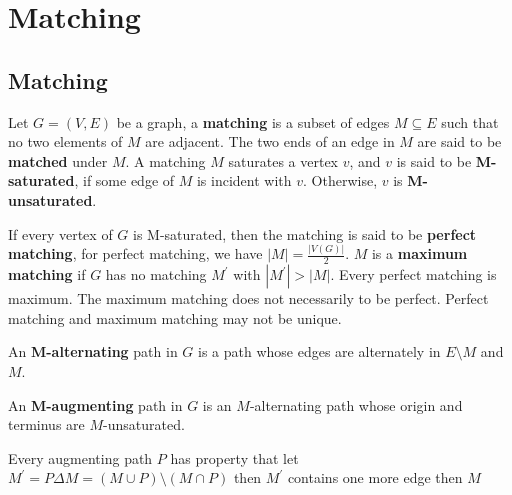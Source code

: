     \section{Matching}
        \subsection{Matching}
            \begin{definition}
                Let $G = (V, E)$ be a graph, a \textbf{matching} is a subset of edges $M \subseteq E$ such that no two elements of $M$ are adjacent. The two ends of an edge in $M$ are said to be \textbf{matched} under $M$. A matching $M$ saturates a vertex $v$, and $v$ is said to be \textbf{M-saturated}, if some edge of $M$ is incident with $v$. Otherwise, $v$ is \textbf{M-unsaturated}.
            \end{definition}

            \begin{definition}
                If every vertex of $G$ is M-saturated, then the matching is said to be \textbf{perfect matching}, for perfect matching, we have $|M| = \frac{|V(G)|}{2}$. $M$ is a \textbf{maximum matching} if $G$ has no matching $M^\prime$ with $|M^\prime| > |M|$. Every perfect matching is maximum. The maximum matching does not necessarily to be perfect. Perfect matching and maximum matching may not be unique.
            \end{definition}

            \begin{definition}[M-alternating]
                An \textbf{M-alternating} path in $G$ is a path whose edges are alternately in $E\setminus M$ and $M$.
            \end{definition}

            \begin{definition}[M-augmenting]
                An \textbf{M-augmenting} path in $G$ is an $M$-alternating path whose origin and terminus are $M$-unsaturated.
            \end{definition}

            \begin{lemma}
                Every augmenting path $P$ has property that let $M^\prime = P\Delta M = (M \cup P) \setminus (M \cap P)$ then $M^\prime$ contains one more edge then $M$
            \end{lemma}

